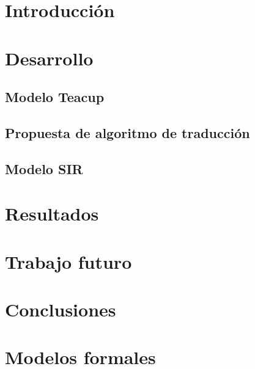 \documentclass[11pt, a4paper]{article}
\begin{document}

\maketitle
\newpage

\tableofcontents
\newpage

%
\section{Introducción}


\section{Desarrollo}

\subsection{Modelo Teacup}

\subsection{Propuesta de algoritmo de traducción}


\subsection{Modelo SIR}


\section{Resultados}


\section{Trabajo futuro}


\section{Conclusiones}


\appendix

\section{Modelos formales}

\end{document}
